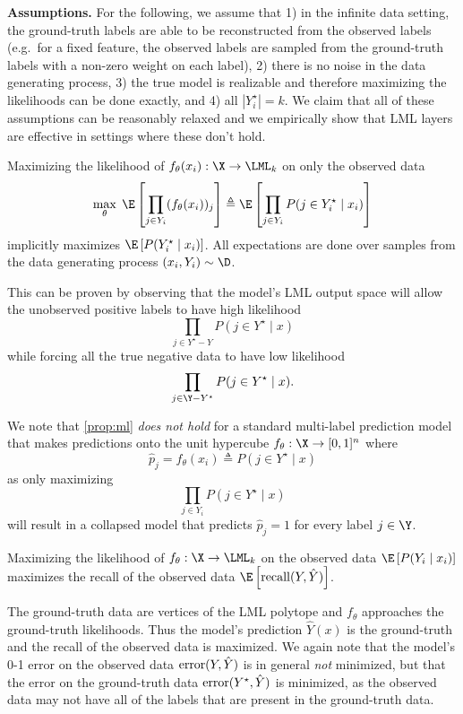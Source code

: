 \textbf{Assumptions.}
For the following, we assume that
1) in the infinite data setting, the ground-truth labels
are able to be reconstructed from the observed labels
(e.g.~for a fixed feature, the observed labels are
sampled from the ground-truth labels with a non-zero
weight on each label),
2) there is no noise in the data generating process,
3) the true model is realizable and therefore
maximizing the likelihoods can be done exactly,
and
4) all $|Y^\star_i|=k$.
We claim that all of these assumptions can be reasonably
relaxed and we empirically show that LML layers are
effective in settings where these don't hold.

\begin{proposition}
  \label{prop:ml}
  Maximizing the likelihood of \mbox{$f_\theta(x_i):\X\rightarrow\LML_k$}
  on only the observed data
  $$\max_\theta\; \E\left[\prod_{j\in Y_i} (f_\theta(x_i))_j \right] \triangleq
  \E\left[ \prod_{j\in Y_i} P(j\in Y_i^\star \mid x_i) \right]$$
  implicitly maximizes
  $\E\left[ P(Y_i^\star \mid x_i) \right]$.
  All expectations are done over samples from the data
  generating process $(x_i, Y_i) \sim \D$.
\end{proposition}

This can be proven by observing that the model's LML
output space will allow the unobserved positive labels to
have high likelihood
$$\prod_{j\in Y^\star-Y} P(j\in Y^\star \mid x)$$
while forcing all the true negative data to have
low likelihood
$$\prod_{j\in \Y-Y^\star} P(j\in Y^\star \mid x).$$

We note that \cref{prop:ml} \emph{does not hold} for
a standard multi-label prediction model that
makes predictions onto the unit hypercube
$f_\theta: \X\rightarrow [0,1]^{n}$
where $$\hat p_j = f_\theta(x_i) \triangleq P(j\in Y^\star \mid x)$$
as only maximizing
$$\prod_{j\in Y_i} P(j\in Y^\star \mid x)$$ will result
in a collapsed model that predicts $\hat p_j=1$
for every label $j\in\Y$.

\begin{corollary}
  Maximizing the likelihood of $f_\theta:\X\rightarrow\LML_k$ on
  the observed data $\E\left[ P(Y_i\mid x_i) \right]$
  maximizes the recall of the observed data
  $\E\left[ {\rm recall}(Y, \hat Y)\right]$.
\end{corollary}

The ground-truth data are vertices of the LML polytope
and $f_\theta$ approaches the ground-truth likelihoods.
Thus the model's prediction $\hat Y(x)$ is the ground-truth
and the recall of the observed data is maximized.
We again note that the model's 0-1 error on the observed data
${\rm error}(Y, \hat Y)$ is in general \emph{not} minimized,
but that the error on the ground-truth data
${\rm error}(Y^\star, \hat Y)$ is minimized,
as the observed data may not have all of the labels that are
present in the ground-truth data.

